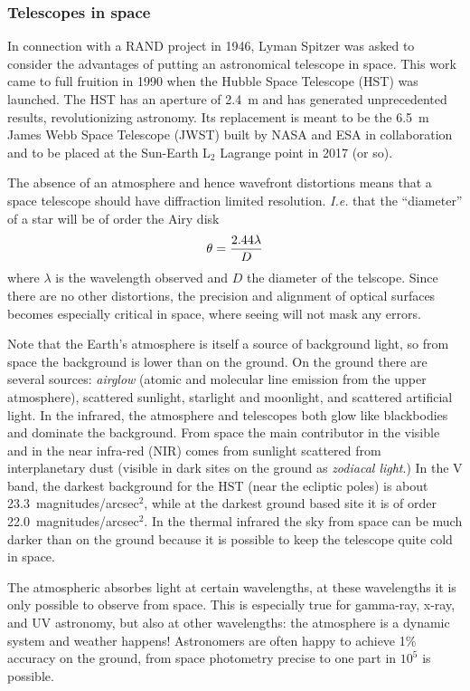 \subsubsection{Telescopes in space}

In connection with a RAND project in 1946, Lyman Spitzer was asked to consider the advantages
of putting an astronomical telescope in space. This work came to full fruition in 1990 
when the Hubble Space Telescope (HST) was launched. The HST has an aperture of 2.4~m and
has generated unprecedented results, revolutionizing astronomy. Its replacement is meant to
be the 6.5~m James Webb Space Telescope (JWST) built by NASA and ESA in collaboration and to
be placed at the Sun-Earth L$_2$ Lagrange point in 2017 (or so).

The absence of an atmosphere and hence wavefront distortions means that a space telescope 
should have diffraction limited resolution. {\it I.e.} that the ``diameter'' of a star will
be of order the Airy disk
\[
\theta={2.44\lambda\over D}
\]
where $\lambda$ is the wavelength observed and $D$ the diameter of the telscope. Since there
are no other distortions, the precision and alignment of optical surfaces becomes especially 
critical in space, where seeing will not mask any errors.

Note that the Earth's atmosphere is itself a source of background light, so from space the
background is lower than on the ground. On the ground there are several sources: {\it 
airglow} (atomic and molecular line emission from the upper atmosphere), scattered sunlight,
starlight and moonlight, and scattered artificial light. In the infrared, the atmosphere and
telescopes both glow like blackbodies and dominate the background. From space the main
contributor in the visible and in the near infra-red (NIR) comes from sunlight scattered from 
interplanetary dust (visible in dark sites on the ground as {\it zodiacal light}.) In the 
V band, the darkest background for the HST (near the ecliptic poles) is about 
23.3~magnitudes/arcsec$^2$, while at the darkest ground based site it is of order 
22.0~magnitudes/arcsec$^2$. In the thermal infrared the sky from space can be much darker than 
on the ground because it is possible to keep the telescope quite cold in space.

The atmospheric absorbes light at certain wavelengths, at these wavelengths it is only possible
to observe from space. This is especially true for gamma-ray, x-ray, and UV astronomy, but also
at other wavelengths: the atmosphere is a dynamic system and weather happens! Astronomers
are often happy to achieve 1\% accuracy on the ground, from space photometry precise to
one part in $10^5$ is possible.

